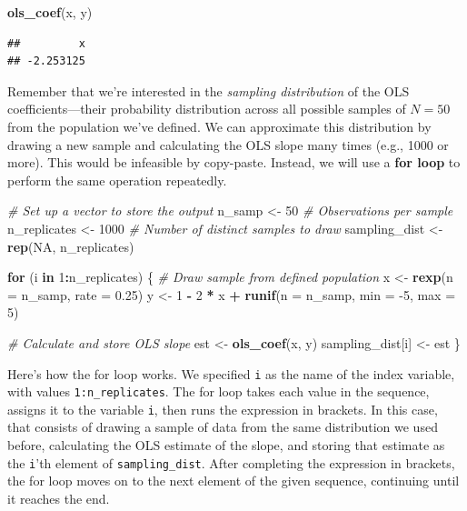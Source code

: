 \documentclass[12pt,oneside,openany]{book}
\newenvironment{Shaded}{\begin{snugshade}}{\end{snugshade}}
\newcommand{\KeywordTok}[1]{\textcolor[rgb]{0.13,0.29,0.53}{\textbf{#1}}}
\newcommand{\DataTypeTok}[1]{\textcolor[rgb]{0.13,0.29,0.53}{#1}}
\newcommand{\DecValTok}[1]{\textcolor[rgb]{0.00,0.00,0.81}{#1}}
\newcommand{\FloatTok}[1]{\textcolor[rgb]{0.00,0.00,0.81}{#1}}
\newcommand{\StringTok}[1]{\textcolor[rgb]{0.31,0.60,0.02}{#1}}
\newcommand{\CommentTok}[1]{\textcolor[rgb]{0.56,0.35,0.01}{\textit{#1}}}
\newcommand{\OtherTok}[1]{\textcolor[rgb]{0.56,0.35,0.01}{#1}}
\newcommand{\ControlFlowTok}[1]{\textcolor[rgb]{0.13,0.29,0.53}{\textbf{#1}}}
\newcommand{\OperatorTok}[1]{\textcolor[rgb]{0.81,0.36,0.00}{\textbf{#1}}}
\newcommand{\NormalTok}[1]{#1}
\begin{document}
\begin{Shaded}
\begin{Highlighting}[]
\KeywordTok{ols_coef}\NormalTok{(x, y)}
\end{Highlighting}
\end{Shaded}

\begin{verbatim}
##         x 
## -2.253125
\end{verbatim}

Remember that we're interested in the \emph{sampling distribution} of
the OLS coefficients---their probability distribution across all
possible samples of \(N = 50\) from the population we've defined. We can
approximate this distribution by drawing a new sample and calculating
the OLS slope many times (e.g., 1000 or more). This would be infeasible
by copy-paste. Instead, we will use a \textbf{for loop} to perform the
same operation repeatedly.

\begin{Shaded}
\begin{Highlighting}[]
\CommentTok{# Set up a vector to store the output}
\NormalTok{n_samp <-}\StringTok{ }\DecValTok{50}  \CommentTok{# Observations per sample}
\NormalTok{n_replicates <-}\StringTok{ }\DecValTok{1000}  \CommentTok{# Number of distinct samples to draw}
\NormalTok{sampling_dist <-}\StringTok{ }\KeywordTok{rep}\NormalTok{(}\OtherTok{NA}\NormalTok{, n_replicates)}

\ControlFlowTok{for}\NormalTok{ (i }\ControlFlowTok{in} \DecValTok{1}\OperatorTok{:}\NormalTok{n_replicates) \{}
  \CommentTok{# Draw sample from defined population}
\NormalTok{  x <-}\StringTok{ }\KeywordTok{rexp}\NormalTok{(}\DataTypeTok{n =}\NormalTok{ n_samp, }\DataTypeTok{rate =} \FloatTok{0.25}\NormalTok{)}
\NormalTok{  y <-}\StringTok{ }\DecValTok{1} \OperatorTok{-}\StringTok{ }\DecValTok{2} \OperatorTok{*}\StringTok{ }\NormalTok{x }\OperatorTok{+}\StringTok{ }\KeywordTok{runif}\NormalTok{(}\DataTypeTok{n =}\NormalTok{ n_samp, }\DataTypeTok{min =} \DecValTok{-5}\NormalTok{, }\DataTypeTok{max =} \DecValTok{5}\NormalTok{)}

  \CommentTok{# Calculate and store OLS slope}
\NormalTok{  est <-}\StringTok{ }\KeywordTok{ols_coef}\NormalTok{(x, y)}
\NormalTok{  sampling_dist[i] <-}\StringTok{ }\NormalTok{est}
\NormalTok{\}}
\end{Highlighting}
\end{Shaded}

Here's how the for loop works. We specified \texttt{i} as the name of
the index variable, with values \texttt{1:n\_replicates}. The for loop
takes each value in the sequence, assigns it to the variable \texttt{i},
then runs the expression in brackets. In this case, that consists of
drawing a sample of data from the same distribution we used before,
calculating the OLS estimate of the slope, and storing that estimate as
the \texttt{i}'th element of \texttt{sampling\_dist}. After completing
the expression in brackets, the for loop moves on to the next element of
the given sequence, continuing until it reaches the end.
\end{document}
